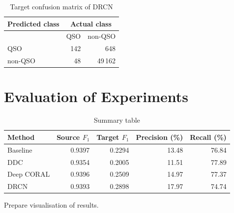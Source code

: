 \begin{table}
\begin{center}
\begin{tabular}{|l|r|r|}
	\hline
	Predicted class & \multicolumn{2}{c|}{Actual class} \\
	\hline \hline
	& QSO & non-QSO \\ \hline
	QSO & 142 & 648 \\ \hline
	non-QSO & 48 & 49\,162 \\ \hline
\end{tabular}
\end{center}
\caption{Target confusion matrix of DRCN}
\end{table}

\section{Evaluation of Experiments}

\begin{table}
\begin{center}
\begin{tabular}{|l|r|r|r|r|}
	\hline
	Method & Source \(F_1\) & Target \(F_1\) & Precision (\%) & Recall (\%) \\
	\hline \hline
	Baseline & 0.9397 & 0.2294 & 13.48 & 76.84 \\ \hline
	DDC & 0.9354 & 0.2005 & 11.51 & 77.89 \\ \hline
	Deep CORAL & 0.9396 & 0.2509 & 14.97 & 77.37 \\ \hline
	DRCN & 0.9393 & 0.2898 & 17.97 & 74.74 \\ \hline
\end{tabular}
\end{center}
\caption{Summary table}
\end{table}

Prepare visualisation of results.

